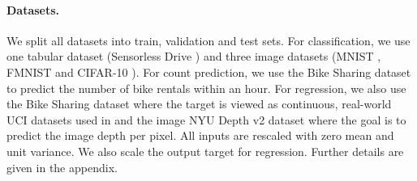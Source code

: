 
\paragraph{Datasets.} We split all datasets into train, validation and test sets. For classification, we use one tabular dataset (Sensorless Drive \citep{uci}) and three image datasets (MNIST \citep{mnist}, FMNIST \citep{fashion-mnist} and CIFAR-10 \citep{cifar10}). For count prediction, we use the Bike Sharing dataset \citep{bike-sharing} to predict the number of bike rentals within an hour. For regression, we also use the Bike Sharing dataset where the target is viewed as continuous, real-world UCI datasets used in \citep{evidential-regression, probabilistic-backprop-scalable-bnn} and the image NYU Depth v2 dataset \citep{nyu-depth} where the goal is to predict the image depth per pixel. All inputs are rescaled with zero mean and unit variance. We also scale the output target for regression. Further details are given in the appendix.

